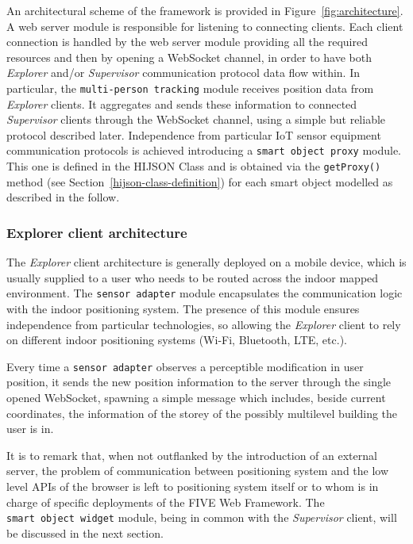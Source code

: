 An architectural scheme of the framework is provided in
Figure~\ref{fig:architecture}. A web server module is responsible for
listening to connecting clients. Each client connection is handled by the web
server module providing all the required resources and then by opening a
WebSocket channel, in order to have both \emph{Explorer} and/or
\emph{Supervisor} communication protocol data flow within. In particular, the
\texttt{multi-person\ tracking} module receives position data from
\emph{Explorer} clients. It aggregates and sends these information to
connected \emph{Supervisor} clients through the WebSocket channel, using a
simple but reliable protocol described later. Independence from particular IoT
sensor equipment communication protocols is achieved introducing a
\texttt{smart\ object\ proxy} module. This one is defined in the HIJSON Class
and is obtained via the \texttt{getProxy()} method (see Section~\ref{hijson-class-definition}) 
for each smart object modelled as described in the follow.

\subsubsection{Explorer client architecture}\label{explorer-client-architecture}

The \emph{Explorer} client architecture is generally deployed on a mobile
device, which is usually supplied to a user who needs to be routed across the indoor mapped
environment. The \texttt{sensor\ adapter} module
encapsulates the communication logic with the indoor positioning system. The
presence of this module ensures independence from particular technologies, so
allowing the \emph{Explorer} client to rely on different indoor positioning
systems (Wi-Fi, Bluetooth, LTE, etc.).

Every time a \texttt{sensor\ adapter} observes a perceptible modification in
user position, it sends the new position information to the server through the
single opened WebSocket, spawning a simple message which includes, beside
current coordinates, the information of the storey of the possibly multilevel
building the user is in.

It is to remark that, when not outflanked by the introduction of an external
server, the problem of communication between positioning system and the low
level APIs of the browser is left to positioning system itself or to whom is
in charge of specific deployments of the FIVE Web Framework.
The \texttt{smart\ object\ widget} module, being in common with the
 \emph{Supervisor} client, will be discussed in the next section.

